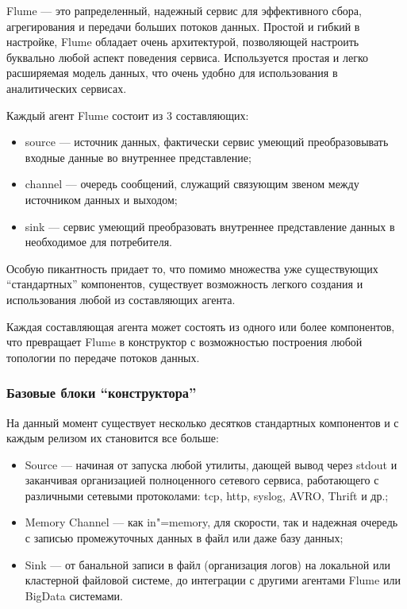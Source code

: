 \documentclass[10pt, a5paper]{article}
\begin{document}
Flume  \cite{Pynkin1} --- это рапределенный, надежный сервис для эффективного сбора, агрегирования и передачи больших потоков данных. Простой и гибкий в настройке, Flume обладает очень архитектурой, позволяющей настроить буквально любой аспект поведения сервиса. Используется простая и легко расширяемая модель данных, что очень удобно для использования в аналитических сервисах.

Каждый агент Flume состоит из 3 составляющих:

\begin{itemize}
  \item source --- источник данных, фактически сервис умеющий преобразовывать входные данные во внутреннее представление;
  \item channel --- очередь сообщений, служащий связующим звеном между источником данных и выходом;
  \item sink --- сервис умеющий преобразовать внутреннее представление данных в необходимое для потребителя.
\end{itemize}

Особую пикантность придает то, что помимо множества уже существующих ``стандартных'' компонентов, существует возможность легкого создания и использования любой из составляющих агента.

Каждая составляющая агента может состоять из одного или более компонентов, что превращает Flume в конструктор с возможностью построения любой топологии по передаче потоков данных.

\subsubsection*{Базовые блоки ``конструктора''}

На данный момент существует несколько десятков стандартных компонентов и с каждым релизом их становится все больше:

\begin{itemize}
  \item Source --- начиная от запуска любой утилиты, дающей вывод через stdout и заканчивая организацией полноценного сетевого сервиса, работающего с различными сетевыми протоколами: tcp, http, syslog, AVRO, Thrift и др.;
  \item Memory Channel --- как in"=memory, для скорости, так и надежная очередь с записью промежуточных данных в файл или даже базу данных;
  \item Sink --- от банальной записи в файл (организация логов) на локальной или кластерной файловой системе, до интеграции с другими агентами Flume или BigData системами.
\end{itemize}
\end{document}
